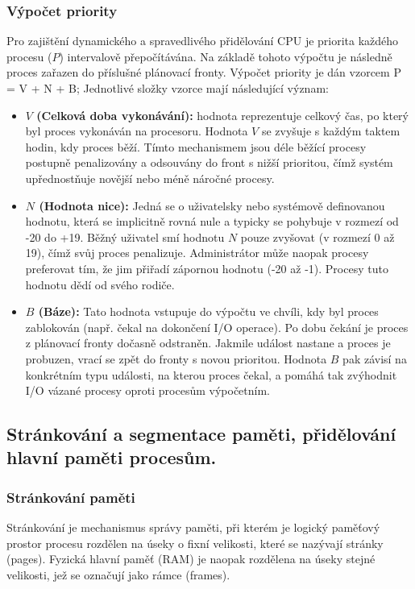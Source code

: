     \subsubsection{Výpočet priority}
        Pro zajištění dynamického a spravedlivého přidělování CPU je priorita každého procesu ($P$) intervalově přepočítávána. Na základě tohoto výpočtu je následně proces zařazen do příslušné plánovací fronty. Výpočet priority je dán vzorcem P = V + N + B; Jednotlivé složky vzorce mají následující význam:
        \begin{itemize}
            \item \textbf{$V$ (Celková doba vykonávání):} hodnota reprezentuje celkový čas, po který byl proces vykonáván na procesoru. Hodnota $V$ se zvyšuje s každým taktem hodin, kdy proces běží. Tímto mechanismem jsou déle běžící procesy postupně penalizovány a odsouvány do front s nižší prioritou, čímž systém upřednostňuje novější nebo méně náročné procesy.
            \item \textbf{$N$ (Hodnota nice):} Jedná se o uživatelsky nebo systémově definovanou hodnotu, která se implicitně rovná nule a typicky se pohybuje v rozmezí od -20 do +19. Běžný uživatel smí hodnotu $N$ pouze zvyšovat (v rozmezí 0 až 19), čímž svůj proces penalizuje. Administrátor může naopak procesy preferovat tím, že jim přiřadí zápornou hodnotu (-20 až -1). Procesy tuto hodnotu dědí od svého rodiče.
            \item \textbf{$B$ (Báze):} Tato hodnota vstupuje do výpočtu ve chvíli, kdy byl proces zablokován (např. čekal na dokončení I/O operace). Po dobu čekání je proces z plánovací fronty dočasně odstraněn. Jakmile událost nastane a proces je probuzen, vrací se zpět do fronty s novou prioritou. Hodnota $B$ pak závisí na konkrétním typu události, na kterou proces čekal, a pomáhá tak zvýhodnit I/O vázané procesy oproti procesům výpočetním.
        \end{itemize}
\subsection{Stránkování a segmentace paměti, přidělování hlavní paměti procesům.}
    \subsubsection{Stránkování paměti}

        Stránkování je mechanismus správy paměti, při kterém je logický paměťový prostor procesu rozdělen na úseky o fixní velikosti, které se nazývají stránky (pages). Fyzická hlavní paměť (RAM) je naopak rozdělena na úseky stejné velikosti, jež se označují jako rámce (frames).
        

